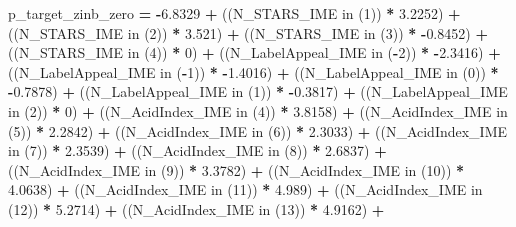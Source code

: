 \documentclass[]{article}
\newenvironment{Shaded}{\begin{snugshade}}{\end{snugshade}}
\newcommand{\KeywordTok}[1]{\textcolor[rgb]{0.13,0.29,0.53}{\textbf{{#1}}}}
\newcommand{\DecValTok}[1]{\textcolor[rgb]{0.00,0.00,0.81}{{#1}}}
\newcommand{\FloatTok}[1]{\textcolor[rgb]{0.00,0.00,0.81}{{#1}}}
\newcommand{\NormalTok}[1]{{#1}}
\begin{document}
\begin{Shaded}
\begin{Highlighting}[]
{{{{{{{{{{{{{{{{{{{{{{{{{{{{{{{{{{{{{{{{{{{{{{{{{    \NormalTok{p_target_zinb_zero }\KeywordTok{=} \KeywordTok{-}\FloatTok{6.8329} \KeywordTok{+}
    \NormalTok{((N_STARS_IME  in (}\DecValTok{1}\NormalTok{)) }\KeywordTok{*}   \FloatTok{3.2252}\NormalTok{)   }\KeywordTok{+}
    \NormalTok{((N_STARS_IME  in (}\DecValTok{2}\NormalTok{)) }\KeywordTok{*}   \FloatTok{3.521}\NormalTok{)   }\KeywordTok{+}
    \NormalTok{((N_STARS_IME  in (}\DecValTok{3}\NormalTok{)) }\KeywordTok{*}   \KeywordTok{-}\FloatTok{0.8452}\NormalTok{)   }\KeywordTok{+}
    \NormalTok{((N_STARS_IME  in (}\DecValTok{4}\NormalTok{)) }\KeywordTok{*}   \DecValTok{0}\NormalTok{)   }\KeywordTok{+}
    \NormalTok{((N_LabelAppeal_IME  in (}\KeywordTok{-}\DecValTok{2}\NormalTok{)) }\KeywordTok{*}   \KeywordTok{-}\FloatTok{2.3416}\NormalTok{)   }\KeywordTok{+}
    \NormalTok{((N_LabelAppeal_IME  in (}\KeywordTok{-}\DecValTok{1}\NormalTok{)) }\KeywordTok{*}   \KeywordTok{-}\FloatTok{1.4016}\NormalTok{)   }\KeywordTok{+}
    \NormalTok{((N_LabelAppeal_IME  in (}\DecValTok{0}\NormalTok{)) }\KeywordTok{*}   \KeywordTok{-}\FloatTok{0.7878}\NormalTok{)   }\KeywordTok{+}
    \NormalTok{((N_LabelAppeal_IME  in (}\DecValTok{1}\NormalTok{)) }\KeywordTok{*}   \KeywordTok{-}\FloatTok{0.3817}\NormalTok{)   }\KeywordTok{+}
    \NormalTok{((N_LabelAppeal_IME  in (}\DecValTok{2}\NormalTok{)) }\KeywordTok{*}   \DecValTok{0}\NormalTok{)   }\KeywordTok{+}
    \NormalTok{((N_AcidIndex_IME  in (}\DecValTok{4}\NormalTok{)) }\KeywordTok{*}   \FloatTok{3.8158}\NormalTok{)   }\KeywordTok{+}
    \NormalTok{((N_AcidIndex_IME  in (}\DecValTok{5}\NormalTok{)) }\KeywordTok{*}   \FloatTok{2.2842}\NormalTok{)   }\KeywordTok{+}
    \NormalTok{((N_AcidIndex_IME  in (}\DecValTok{6}\NormalTok{)) }\KeywordTok{*}   \FloatTok{2.3033}\NormalTok{)   }\KeywordTok{+}
    \NormalTok{((N_AcidIndex_IME  in (}\DecValTok{7}\NormalTok{)) }\KeywordTok{*}   \FloatTok{2.3539}\NormalTok{)   }\KeywordTok{+}
    \NormalTok{((N_AcidIndex_IME  in (}\DecValTok{8}\NormalTok{)) }\KeywordTok{*}   \FloatTok{2.6837}\NormalTok{)   }\KeywordTok{+}
    \NormalTok{((N_AcidIndex_IME  in (}\DecValTok{9}\NormalTok{)) }\KeywordTok{*}   \FloatTok{3.3782}\NormalTok{)   }\KeywordTok{+}
    \NormalTok{((N_AcidIndex_IME  in (}\DecValTok{10}\NormalTok{)) }\KeywordTok{*}   \FloatTok{4.0638}\NormalTok{)   }\KeywordTok{+}
    \NormalTok{((N_AcidIndex_IME  in (}\DecValTok{11}\NormalTok{)) }\KeywordTok{*}   \FloatTok{4.989}\NormalTok{)   }\KeywordTok{+}
    \NormalTok{((N_AcidIndex_IME  in (}\DecValTok{12}\NormalTok{)) }\KeywordTok{*}   \FloatTok{5.2714}\NormalTok{)   }\KeywordTok{+}
    \NormalTok{((N_AcidIndex_IME  in (}\DecValTok{13}\NormalTok{)) }\KeywordTok{*}   \FloatTok{4.9162}\NormalTok{)   }\KeywordTok{+}
}}}}}}}}}}}}}}}}}}}}}}}}}}}}}}}}}}}}}}}}}}}}}}}}}
\end{Highlighting}
\end{Shaded}
\end{document}
